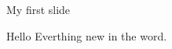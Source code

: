 \documentclass[clock]{slides}
\begin{document}
\begin{slide}
\begin{center}
  My first slide
\end{center}

Hello Everthing new in the word.
\end{slide}
\end{document}
